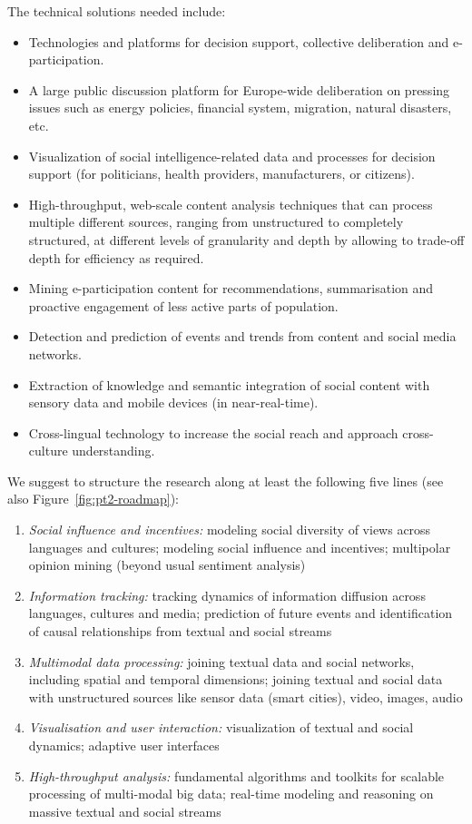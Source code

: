 \documentclass[10pt, plain]{../../metanetpaper}
\begin{document}
\begin{multicols}{2}
The technical solutions needed include:

\begin{itemize}
\item Technologies and platforms for decision support, collective deliberation and e-participation.
\item A large public discussion platform for Europe-wide deliberation on pressing issues such as energy policies, financial system, migration, natural disasters, etc.
\item Visualization of social intelligence-related data and processes for decision support (for politicians, health providers, manufacturers, or citizens).
\item High-throughput, web-scale content analysis techniques that can process multiple different sources, ranging from unstructured to completely structured, at different levels of granularity and depth by allowing to trade-off depth for efficiency as required.
\item Mining e-participation content for recommendations, summarisation and proactive engagement of less active parts of population.
\item Detection and prediction of events and trends from content and social media networks.
\item Extraction of knowledge and semantic integration of social content with sensory data and mobile devices (in near-real-time).
\item Cross-lingual technology to increase the social reach and approach cross-culture understanding.
\end{itemize}

We suggest to structure the research along at least the following five lines (see also Figure~\ref{fig:pt2-roadmap}):


\begin{enumerate}
\item \emph{Social influence and incentives:} modeling social diversity of views across languages and cultures; modeling social influence and incentives; multipolar opinion mining (beyond usual sentiment analysis) 
\item \emph{Information tracking:} tracking dynamics of information diffusion across languages, cultures and media; prediction of future events and identification of causal relationships from textual and social streams
\item \emph{Multimodal data processing:} joining textual data and social networks, including spatial and temporal dimensions; joining textual and social data with unstructured sources like sensor data (smart cities), video, images, audio
\item \emph{Visualisation and user interaction:} visualization of textual and social dynamics; adaptive user interfaces
\item \emph{High-throughput analysis:} fundamental algorithms and toolkits for scalable processing of multi-modal big data;
real-time modeling and reasoning on massive textual and social streams
\end{enumerate}


\end{multicols}
\end{document}
